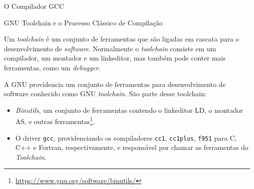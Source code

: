 \begin{section}{O Compilador GCC}
%
%


\begin{subsection}{GNU Toolchain e o Processo Clássico de Compilação}

    Um \textit{toolchain} é um conjunto de ferramentas que são ligadas em
cascata para o desenvolvimento de \textit{software}. Normalmente o
\textit{toolchain} consiste em um compilador, um montador e um linkeditor,
mas também pode conter mais ferramentas, como um \textit{debugger}.

A GNU providencia um conjunto de ferramentas para desenvolvimento de software
conhecido como GNU \textit{toolchain}. São parte desse toolchain:
\begin{itemize}
    \item \textit{Binutils}, um conjunto de ferramentas contendo o linkeditor
LD, o montador AS, e outras ferramentas\footnote{\url{https://www.gnu.org/software/binutils/}}.
    \item O driver \texttt{gcc}, providenciando os compiladores \texttt{cc1},
        \texttt{cc1plus}, \texttt{f951} para C, C++ e Fortran, respectivamente,
        e responsável por chamar as ferramentas do \textit{Toolchain}.


\end{itemize}
\end{subsection}
\end{section}
